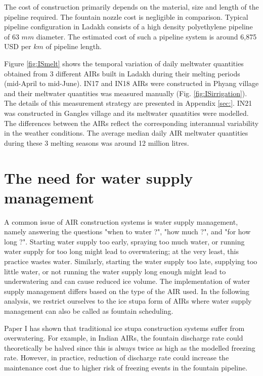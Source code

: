 The cost of construction primarily depends on the material, size and length of the pipeline required. The
fountain nozzle cost is negligible in comparison. Typical pipeline configuration in Ladakh consists of a high
density polyethylene pipeline of 63 $mm$ diameter. The estimated cost of such a pipeline system is around 6,875
USD per $km$ of pipeline length.

Figure \ref{fig:ISmelt} shows the temporal variation of daily meltwater quantities obtained from 3 different
AIRs built in Ladakh during their melting periods (mid-April to mid-June). IN17 and IN18 AIRs were constructed
in Phyang village and their meltwater quantities was measured manually  (Fig. \ref{fig:ISirrigation}). The
details of this measurement strategy are presented in Appendix \ref{sec:}. IN21 was constructed in Gangles
village and its meltwater quantities were modelled. The differences between the AIRs reflect the corresponding
interannual variability in the weather conditions. The average median daily AIR meltwater quantities during
these 3 melting seasons was around 12 million litres.   

\section{The need for water supply management}

A common issue of AIR construction systems is water supply management, namely answering the questions "when to
water ?", "how much ?", and "for how long ?". Starting water supply too early, spraying too much water, or
running water supply for too long might lead to overwatering; at the very least, this practice wastes water.
Similarly, starting the water supply too late, supplying too little water, or not running the water supply long
enough might lead to underwatering and can cause reduced ice volume. The implementation of water supply management
differs based on the type of the AIR used. In the following analysis, we restrict ourselves to the ice stupa
form of AIRs where water supply management can also be called as fountain scheduling.

Paper I has shown that traditional ice stupa construction systems suffer from overwatering. For example, in
Indian AIRs, the fountain discharge rate could theoretically be halved since this is always twice as high as the
modelled freezing rate. However, in practice, reduction of discharge rate could increase the maintenance cost
due to higher risk of freezing events in the fountain pipeline.

